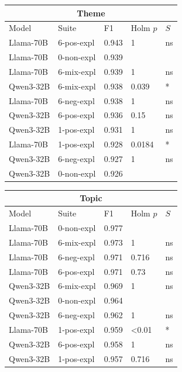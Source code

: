 \begin{table}
    \centering
    \scriptsize

    
\begin{tabular}{ll|lll}
\toprule
\multicolumn{5}{c}{\textbf{Theme}} \\
\midrule
Model & Suite & F1 & Holm $p$ & $S$ \\
\midrule
Llama-70B & 6-pos-expl & 0.943 & 1 & ns \\
Llama-70B & 0-non-expl & 0.939 &  &  \\
Llama-70B & 6-mix-expl & 0.939 & 1 & ns \\
Qwen3-32B & 6-mix-expl & 0.938 & 0.039 & * \\
Llama-70B & 6-neg-expl & 0.938 & 1 & ns \\
Qwen3-32B & 6-pos-expl & 0.936 & 0.15 & ns \\
Qwen3-32B & 1-pos-expl & 0.931 & 1 & ns \\
Llama-70B & 1-pos-expl & 0.928 & 0.0184 & * \\
Qwen3-32B & 6-neg-expl & 0.927 & 1 & ns \\
Qwen3-32B & 0-non-expl & 0.926 &  &  \\
\bottomrule
\end{tabular}
\begin{tabular}{ll|lll}
\toprule
\multicolumn{5}{c}{\textbf{Topic}} \\
\midrule
Model & Suite & F1 & Holm $p$ & $S$ \\
\midrule
Llama-70B & 0-non-expl & 0.977 &  &  \\
Llama-70B & 6-mix-expl & 0.973 & 1 & ns \\
Llama-70B & 6-neg-expl & 0.971 & 0.716 & ns \\
Llama-70B & 6-pos-expl & 0.971 & 0.73 & ns \\
Qwen3-32B & 6-mix-expl & 0.969 & 1 & ns \\
Qwen3-32B & 0-non-expl & 0.964 &  &  \\
Qwen3-32B & 6-neg-expl & 0.962 & 1 & ns \\
Llama-70B & 1-pos-expl & 0.959 & <0.01 & * \\
Qwen3-32B & 6-pos-expl & 0.958 & 1 & ns \\
Qwen3-32B & 1-pos-expl & 0.957 & 0.716 & ns \\
\bottomrule
\end{tabular}


\end{table}
